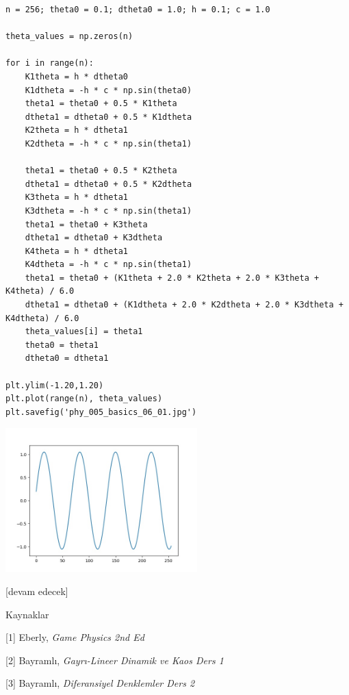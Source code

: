 \documentclass[12pt,fleqn]{article}\usepackage{../../common}
\begin{document}
\begin{verbatim}
n = 256; theta0 = 0.1; dtheta0 = 1.0; h = 0.1; c = 1.0

theta_values = np.zeros(n)

for i in range(n):
    K1theta = h * dtheta0
    K1dtheta = -h * c * np.sin(theta0)
    theta1 = theta0 + 0.5 * K1theta
    dtheta1 = dtheta0 + 0.5 * K1dtheta
    K2theta = h * dtheta1
    K2dtheta = -h * c * np.sin(theta1)

    theta1 = theta0 + 0.5 * K2theta
    dtheta1 = dtheta0 + 0.5 * K2dtheta
    K3theta = h * dtheta1
    K3dtheta = -h * c * np.sin(theta1)
    theta1 = theta0 + K3theta
    dtheta1 = dtheta0 + K3dtheta
    K4theta = h * dtheta1
    K4dtheta = -h * c * np.sin(theta1)
    theta1 = theta0 + (K1theta + 2.0 * K2theta + 2.0 * K3theta + K4theta) / 6.0
    dtheta1 = dtheta0 + (K1dtheta + 2.0 * K2dtheta + 2.0 * K3dtheta + K4dtheta) / 6.0
    theta_values[i] = theta1
    theta0 = theta1
    dtheta0 = dtheta1

plt.ylim(-1.20,1.20)
plt.plot(range(n), theta_values)
plt.savefig('phy_005_basics_06_01.jpg')
\end{verbatim}

\includegraphics[width=20em]{phy_005_basics_06_01.jpg}












[devam edecek]

Kaynaklar

[1] Eberly, {\em Game Physics 2nd Ed}

[2] Bayramlı, {\em Gayrı-Lineer Dinamik ve Kaos Ders 1}

[3] Bayramlı, {\em Diferansiyel Denklemler Ders 2}
\end{document}
